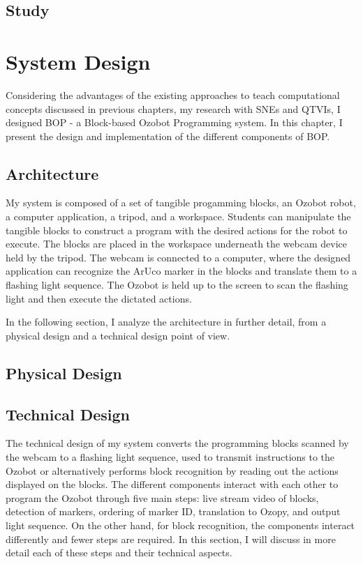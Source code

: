 \documentclass[oneside,%
                    author={Malak Hajji},
                    degree={BSc},
                    title={Designing An Accessible Computational Toolkit For Students},
                  subtitle={With Mixed Visual Abilities}]{dissertation}
\begin{document}
\section{Study}

\chapter{System Design}
Considering the advantages of the existing approaches to teach computational concepts discussed in previous chapters, my research with SNEs and QTVIs, I designed BOP - a Block-based Ozobot Programming system. In this chapter, I present the design and implementation of the different components of BOP.

\section{Architecture}
My system is composed of a set of tangible progamming blocks, an Ozobot robot, a computer application, a tripod, and a workspace. Students can manipulate the tangible blocks to construct a program with the desired actions for the robot to execute. The blocks are placed in the workspace underneath the webcam device held by the tripod. The webcam is connected to a computer, where the designed application can recognize the ArUco marker in the blocks and translate them to a flashing light sequence. The Ozobot is held up to the screen to scan the flashing light and then execute the dictated actions.

In the following section, I analyze the architecture in further detail, from a physical design and a technical design point of view.

\section{Physical Design}

\section{Technical Design}
The technical design of my system converts the programming blocks scanned by the webcam to a flashing light sequence, used to transmit instructions to the Ozobot or alternatively performs block recognition by reading out the actions displayed on the blocks. The different components interact with each other to program the Ozobot through five main steps: live stream video of blocks, detection of markers, ordering of marker ID, translation to Ozopy, and output light sequence. On the other hand, for block recognition, the components interact differently and fewer steps are required. In this section, I will discuss in more detail each of these steps and their technical aspects. 
 
\end{document}
